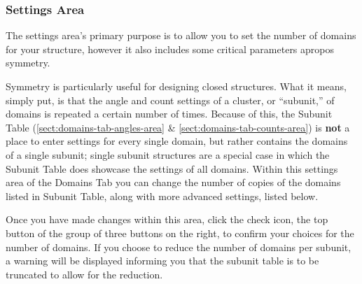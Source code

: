 \documentclass[titlepage]{article}
\begin{document}
\subsubsection{Settings Area}
\label{sect:domains-tab-settings-area}

The settings area's primary purpose is to allow you to set the number of domains for your structure, however it also includes some critical parameters apropos symmetry.

Symmetry is particularly useful for designing closed structures. What it means, simply put, is that the angle and count settings of a cluster, or ``subunit,'' of domains is repeated a certain number of times. Because of this, the Subunit Table (\ref{sect:domains-tab-angles-area} \& \ref{sect:domains-tab-counts-area}) is \textbf{not} a place to enter settings for every single domain, but rather contains the domains of a single subunit; single subunit structures are a special case in which the Subunit Table does showcase the settings of all domains. Within this settings area of the Domains Tab you can change the number of copies of the domains listed in Subunit Table, along with more advanced settings, listed below. 

Once you have made changes within this area, click the check icon, the top button of the group of three buttons on the right, to confirm your choices for the number of domains. If you choose to reduce the number of domains per subunit, a warning will be displayed informing you that the subunit table is to be truncated to allow for the reduction.
\end{document}
